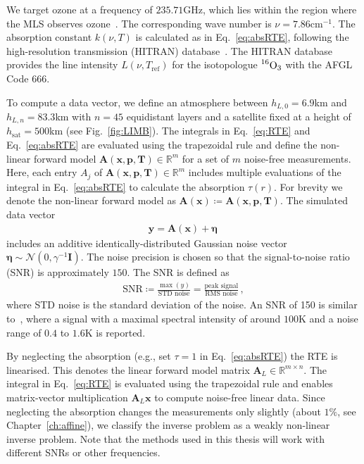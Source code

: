 We target ozone at a frequency of $235.71$GHz, which lies within the region where the MLS observes ozone~\cite{livesey2008ozonecarbonmono, waters2006earth}.
The corresponding wave number is $\nu = 7.86\text{cm}^{-1}$.
The absorption constant $k(\nu,T)$ is calculated as in Eq.~\ref{eq:absRTE}, following the high-resolution transmission (HITRAN) database~\cite{gordon2022hitran2020}.
The HITRAN database provides the line intensity $L(\nu,T_{\text{ref}})$ for the isotopologue $\prescript{16}{}{\text{O}}_3$ with the AFGL Code 666.

To compute a data vector, we define an atmosphere between $h_{L,0} = 6.9$km and $h_{L,n} = 83.3$km with $n = 45$ equidistant layers and a satellite fixed at a height of $h_{\text{sat}} = 500$km (see Fig.~\ref{fig:LIMB}).
The integrals in Eq.~\ref{eq:RTE} and Eq.~\ref{eq:absRTE} are evaluated using the trapezoidal rule and define the non-linear forward model $\bm{A}(\bm{x},  \bm{p},\bm{T})   \in \mathbb{R}^{m}$ for a set of $m$ noise-free measurements.
Here, each entry $A_{j}$ of $\bm{A}(\bm{x},\bm{p},\bm{T})\in \mathbb{R}^{m}$ includes multiple evaluations of the integral in Eq.~\ref{eq:absRTE} to calculate the absorption $\tau(r)$.
For brevity we denote the non-linear forward model as $\bm{A}(\bm{x}) \coloneqq \bm{A}(\bm{x},  \bm{p},\bm{T})$.
The simulated data vector
\begin{align}
	\bm{y} = \bm{A}(\bm{x}) + \bm{\eta}\, 
\end{align}
includes an additive identically-distributed Gaussian noise vector $\bm{\eta} \sim \mathcal{N}(0,\gamma^{-1} \bm{I})$.
The noise precision is chosen so that the signal-to-noise ratio (SNR) is approximately $150$.
The SNR is defined as
\begin{align}
	\text{SNR} \coloneqq \frac{\max(y)}{\text{STD noise}} = \frac{\text{peak signal}}{\text{RMS noise}} \label{eq:SNR} \, ,
\end{align}
where STD noise is the standard deviation of the noise.
An SNR of 150 is similar to~\cite{Froidevaux2008snrozone}, where a signal with a maximal spectral intensity of around $100\text{K}$ and a noise range of $0.4$ to $1.6\text{K}$ is reported.

By neglecting the absorption (e.g., set $\tau = 1$ in Eq.~\eqref{eq:absRTE}) the RTE is linearised.
This denotes the linear forward model matrix $\bm{A}_L\in \mathbb{R}^{m\times n}$.
The integral in Eq.~\eqref{eq:RTE} is evaluated using the trapezoidal rule and enables matrix-vector multiplication $\bm{A}_L \bm{x}$ to compute noise-free linear data.
Since neglecting the absorption changes the measurements only slightly (about $1\%$, see Chapter~\ref{ch:affine}), we classify the inverse problem as a weakly non-linear inverse problem.
Note that the methods used in this thesis will work with different SNRs or other frequencies.




